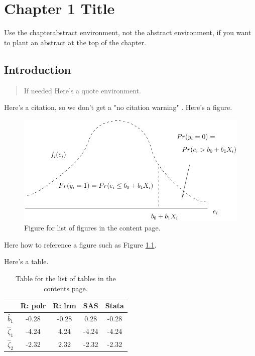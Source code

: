\chapter{Chapter 1 Title}

\begin{chapterabstract}
    Use the chapterabstract environment, not the abstract environment, if you want to plant an abstract at the top of the chapter.
\end{chapterabstract}

\section{Introduction}

\begin{quote}
If needed Here's a quote environment.
\end{quote}


Here's a citation, so we don't get a "no citation warning" \cite{GolV13}. Here's a figure.
\begin{figure}
    \begin{centering}
        \includegraphics[scale=0.8]{chap_1/chap_1_figures/example_1.pdf}
    \par\end{centering}
    \caption{Figure for list of figures  in the content page.}
    \label{fig:first_fig}
\end{figure}
Here how to reference a figure such as Figure \ref{fig:first_fig}.
\newpage



Here's a table.
\begin{table}
    \centering{}
    \begin{tabular}{|c|c|c|c|c|}
        \hline
            & R: polr & R: lrm & SAS & Stata\tabularnewline
        \hline
        \hline
        $\hat{b}_{1}$ & -0.28 & -0.28 & 0.28 & -0.28\tabularnewline
        \hline
        $\hat{\zeta}_{1}$ & -4.24 & 4.24 & -4.24 & -4.24\tabularnewline
        \hline
        $\hat{\zeta}_{2}$ & -2.32 & 2.32 & -2.32 & -2.32\tabularnewline
        \hline
    \end{tabular}
    \caption{Table for the list of tables in the contents page.}
    \label{tab:random_table}
\end{table}
